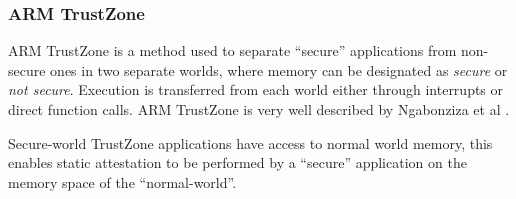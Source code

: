 \subsubsection*{ARM TrustZone}

ARM TrustZone is a method used to separate ``secure'' applications from non-secure ones in two separate worlds, where memory can be designated as \textit{secure} or \textit{not secure}. Execution is transferred from each world either through interrupts or direct function calls. ARM TrustZone is very well described by Ngabonziza et al \cite{Ngabonziza2017}.

Secure-world TrustZone applications have access to normal world memory, this enables static attestation to be performed by a ``secure'' application on the memory space of the ``normal-world''.
